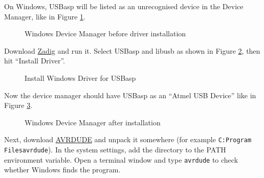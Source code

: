 \documentclass{article}
\newcommand{\file}[1]{\texttt{#1}}
\begin{document}
On Windows, USBasp will be listed as an unrecognised device in the Device Manager, like in Figure \ref{fig:deviceManagerBefore}. 
\begin{figure}[htb]
\centering
{}
\caption{Windows Device Manager before driver installation}
\label{fig:deviceManagerBefore}
\end{figure}

Download \href{https://zadig.akeo.ie/}{Zadig} and run it. Select USBasp and libusb as shown in Figure \ref{fig:driverUSBasp}, then hit ``Install Driver''. 
\begin{figure}[htb]
\centering
{}
\caption{Install Windows Driver for USBasp}
\label{fig:driverUSBasp}
\end{figure}

Now the device manager should have USBasp as an ``Atmel USB Device'' like in Figure \ref{fig:deviceManagerAfter}. 
\begin{figure}[htb]
\centering
{}
\caption{Windows Device Manager after installation}
\label{fig:deviceManagerAfter}
\end{figure}

Next, download \href{https://github.com/avrdudes/avrdude/releases}{AVRDUDE} and unpack it somewhere (for example \file{C:Program Files\symbol{`\\}avrdude}). In the system settings, add the directory to the PATH environment variable. Open a terminal window and type \lstinline[language=bash]{avrdude} to check whether Windows finds the program. 
\end{document}
